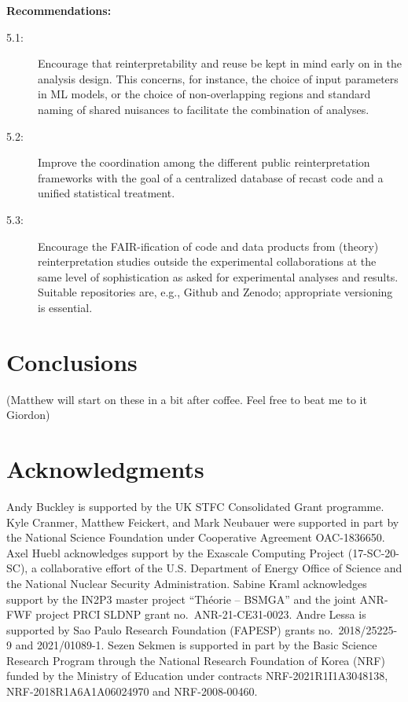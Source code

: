 \documentclass[11pt]{article}
\begin{document}
\noindent
\textbf{Recommendations:}
\begin{description}
   \item[5.1:] Encourage that reinterpretability and reuse be kept in mind early on in the analysis design. This concerns, for instance, the choice of input parameters in \gls{ML} models, or the choice of non-overlapping regions and standard naming of shared nuisances to facilitate the combination of analyses.   
   \item[5.2:] Improve the coordination among the different public reinterpretation frameworks  with the goal of a centralized database of recast code and a unified statistical treatment.
   \item[5.3:] Encourage the \gls{FAIR}-ification of code and data products from (theory) reinterpretation studies outside the experimental collaborations at the same level of sophistication as asked for experimental analyses and results. Suitable repositories are, e.g., Github and Zenodo; appropriate versioning is essential.
\end{description}


\section{Conclusions}

(Matthew will start on these in a bit after coffee. Feel free to beat me to it Giordon)

\section*{Acknowledgments}

Andy Buckley is supported by the UK STFC Consolidated Grant programme.
Kyle Cranmer, Matthew Feickert, and Mark Neubauer were supported in part by the National Science Foundation under Cooperative Agreement OAC-1836650.
Axel Huebl acknowledges support by the Exascale Computing Project (17-SC-20-SC), a collaborative effort of the U.S. Department of Energy Office of Science and the National Nuclear Security Administration.
Sabine Kraml acknowledges support by the IN2P3 master project ``Th\'eorie -- BSMGA'' and the joint ANR-FWF project PRCI SLDNP grant no.~ANR-21-CE31-0023.
Andre Lessa is supported by Sao Paulo Research Foundation (FAPESP) grants no.~2018/25225-9 and 2021/01089-1.
Sezen Sekmen is supported in part by the Basic Science Research Program through the National Research Foundation of Korea (NRF) funded by the Ministry of Education under contracts NRF-2021R1I1A3048138, NRF-2018R1A6A1A06024970 and NRF-2008-00460.


\def\thefootnote{\fnsymbol{footnote}}
\setcounter{footnote}{0}




%
\clearpage
\printglossaries
\end{document}
